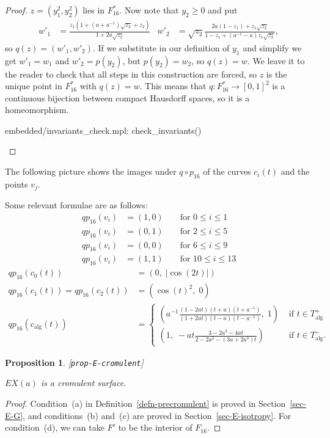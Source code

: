 \documentclass[reqno]{amsart}
\newcommand{\lbl}[1]{\label{#1}\textup{[\texttt{#1}]}\par}
\newcommand{\lbl}{\label}
\newcommand{\alg}	{\operatorname{alg}}
\renewcommand{\:}{\colon}
\newtheorem{proposition}[theorem]{Proposition}
\theoremstyle{definition}
\begin{document}
\begin{proof}
 $z=(y_1^2,y_2^2)$ lies in $F_{16}^*$.  Now note that $y_2\geq 0$ and put
 \begin{align*}
  w'_1 &= \frac{z_1(1+(a+a^{-1})\sqrt{z_2}+z_2)}{1+2a\sqrt{z_2}} &
  w'_2 &=
   \sqrt{z_2}\frac{2a(1-z_1)+z_1\sqrt{z_2}}{1-z_1+(a^{-1}-a)z_1\sqrt{z_2}},
 \end{align*}
 so $q(z)=(w'_1,w'_2)$.  If we substitute in our definition of $y_1$
 and simplify we get $w'_1=w_1$ and $w'_2=p(y_2)$, but $p(y_2)=w_2$,
 so $q(z)=w$.  We leave it to the reader to check that all steps in this
 construction are forced, so $z$ is the unique point in $F_{16}^*$ with
 $q(z)=w$.  This means that $q\:F_{16}^*\to [0,1]^2$ is a continuous
 bijection between compact Hausdorff spaces, so it is a
 homeomorphism.
 \begin{checks}
  embedded/invariants_check.mpl: check_invariants()
 \end{checks}
\end{proof}

The following picture shows the images under $q\circ p_{16}$ of the
curves $c_i(t)$ and the points $v_j$.


Some relevant formulae are as follows:
\begin{align*}
 qp_{16}(v_i) &= (1,0)      && \text{ for } 0\leq i \leq 1 \\
 qp_{16}(v_i) &= (0,1)      && \text{ for } 2\leq i \leq 5 \\
 qp_{16}(v_i) &= (0,0)      && \text{ for } 6\leq i \leq 9 \\
 qp_{16}(v_i) &= (1,1)      && \text{ for } 10\leq i \leq 13
\end{align*}
\begin{align*}
 qp_{16}(c_0(t)) &=\! (0,\;|\cos(2t)|) \\
 qp_{16}(c_1(t))=qp_{16}(c_2(t)) &=\! (\cos(t)^2,\;0) \\
 qp_{16}(c_{\alg}(t)) &=\! \begin{cases}
    \left(a^{-1}\frac{(1-2at)(t+a)(t+a^{-1})}{(1+2at)(t-a)(t-a^{-1})},\;1\right)
     & \text{ if } t\in T_{\alg}^+ \\
    \left(1,\;-at\frac{3-2a^2-4at}{2-2a^2-(3a+2a^3)t}\right)
     & \text{ if } t\in T_{\alg}^-.
   \end{cases}
\end{align*}

\begin{proposition}\lbl{prop-E-cromulent}
 $EX(a)$ is a cromulent surface.
\end{proposition}
\begin{proof}
 Condition~(a) in Definition~\ref{defn-precromulent} is proved in
 Section~\ref{sec-E-G}, and conditions~(b) and~(c) are
 proved in Section~\ref{sec-E-isotropy}.  For condition~(d),
 we can take $F'$ to be the interior of $F_{16}$.
\end{proof}
\end{document}
